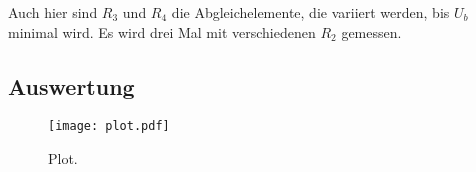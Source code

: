 Auch hier sind $R_3$ und $R_4$ die Abgleichelemente, die variiert werden,
bis $U_b$ minimal wird. Es wird drei Mal mit verschiedenen $R_2$ gemessen.

\subsection{Auswertung}
\label{subsec:Auswertung}

\begin{figure}
  \centering
  \texttt{[image: plot.pdf]}
  \caption{Plot.}
  \label{fig:plot}
\end{figure}